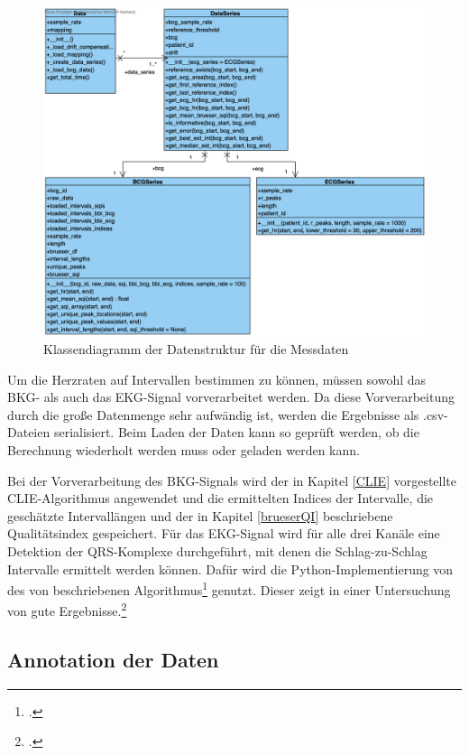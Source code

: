 	\begin{figure}[H]
		\centering
		\includegraphics[width=\textwidth]{pic/data-prep-classes.png}
		\caption[Klassendiagramm der Datenstruktur für die Messdaten]{Klassendiagramm der Datenstruktur für die Messdaten}
		\label{fig:data-prep-class}
	\end{figure}
	
	Um die Herzraten auf Intervallen bestimmen zu können, müssen sowohl das \ac{BKG}- als auch das \ac{EKG}-Signal vorverarbeitet werden. Da diese Vorverarbeitung durch die große Datenmenge sehr aufwändig ist, werden die Ergebnisse als .csv-Dateien serialisiert. Beim Laden der Daten kann so geprüft werden, ob die Berechnung wiederholt werden muss oder geladen werden kann.
	
	Bei der Vorverarbeitung des \ac{BKG}-Signals wird der in Kapitel \ref{CLIE} vorgestellte CLIE-Algorithmus angewendet und die ermittelten Indices der Intervalle, die geschätzte Intervallängen und der in Kapitel \ref{brueserQI} beschriebene Qualitätsindex gespeichert. Für das \ac{EKG}-Signal wird für alle drei Kanäle eine Detektion der QRS-Komplexe durchgeführt, mit denen die Schlag-zu-Schlag Intervalle ermittelt werden können. Dafür wird die Python-Implementierung von \citeauthor{Howell2019} des von \citeauthor{Elgendi2010} beschriebenen Algorithmus\footcite[][]{Elgendi2010} genutzt. Dieser zeigt in einer Untersuchung von \citeauthor{Porr2019} gute Ergebnisse.\footcite[Vgl.][]{Porr2019}
	
	
	\subsection{Annotation der Daten}\label{annotation}
	
